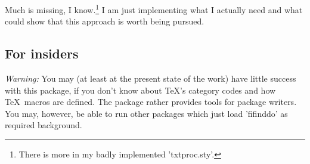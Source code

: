 \documentclass[fleqn]{article}
\begin{document}
Much is missing, I know.\footnote{There 
  is more in my badly implemented 'txtproc.sty'.}
I am just implementing what I actually need 
and what could show that this approach is worth being pursued. 

\subsection{For insiders}

\emph{Warning:} You may (at least at the present state of the work) 
have little success with this package, if you don't know about 
\TeX's category codes and how \TeX\ macros are defined. 
The package rather provides tools for package writers. 
You may, however, be able to run other packages which just load 
'fifinddo' as required background.
\end{document}
